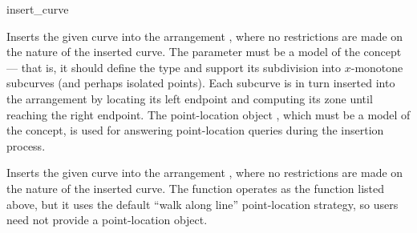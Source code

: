 
\ccRefPageBegin

\begin{ccRefFunction}{insert_curve}


   {Inserts the given curve  into the arrangement , where
    no restrictions are made on the nature of the inserted curve.
    The  parameter must be a model of the
    concept --- that is, it should define the  type and support
    its subdivision into $x$-monotone subcurves (and perhaps isolated points).
    Each subcurve is in turn inserted into the arrangement by locating its
    left endpoint and computing its zone until reaching the right endpoint.
    The point-location object , which must be a model of the
     concept, is used for answering
    point-location queries during the insertion process.
    }

   {Inserts the given curve  into the arrangement , where
    no restrictions are made on the nature of the inserted curve.
    The function operates as the function listed above, but it uses the default
    ``walk along line'' point-location strategy, so users need not provide a
    point-location object.}

\end{ccRefFunction}

\ccRefPageEnd
